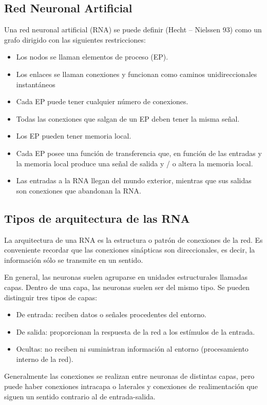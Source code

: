 \documentclass[12pt]{book} %
\begin{document}
	\subsection{Red Neuronal Artificial} 
		Una red neuronal artificial (RNA) se puede definir (Hecht – Nielssen 93) como un grafo dirigido con las siguientes restricciones:	
		\begin{multicols}{2}
		 \begin{itemize}
		 	\item Los nodos se llaman elementos de proceso (EP).
		    \item Los enlaces se llaman conexiones y funcionan como caminos unidireccionales instantáneos
		    \item Cada EP puede tener cualquier número de conexiones.
		    \item Todas las conexiones que salgan de un EP deben tener la misma señal.
		    \item Los EP pueden tener memoria local.
		    \item Cada EP posee una función de transferencia que, en función de las entradas y la memoria local produce una señal de salida 
		    y / o altera la memoria local.
			\item Las entradas a la RNA llegan del mundo exterior, mientras que sus salidas son conexiones que abandonan la RNA.

			 \end{itemize}
		 \end{multicols}
	\subsection{Tipos de arquitectura de las RNA}
		 La arquitectura de una RNA es la estructura o patrón de conexiones de la red. Es conveniente recordar que las conexiones sinápticas son
		 direccionales, es decir, la información sólo se transmite en un sentido.
		 
		En general, las neuronas suelen agruparse en unidades estructurales llamadas capas. Dentro de una capa, las neuronas suelen ser del mismo 
		tipo. Se pueden distinguir tres tipos de capas:
		\begin{multicols}{2}
			\begin{itemize}
		 		\item De entrada: reciben datos o señales procedentes del entorno.
		 	   \item De salida: proporcionan la respuesta de la red a los estímulos de la entrada.
		   	 \item Ocultas: no reciben ni suministran información al entorno (procesamiento interno de la red).
		 	\end{itemize}
		\end{multicols}
		Generalmente las conexiones se realizan entre neuronas de distintas capas, pero puede haber conexiones intracapa o laterales y conexiones de
		realimentación que siguen un sentido contrario al de entrada-salida.
		
\end{document}
